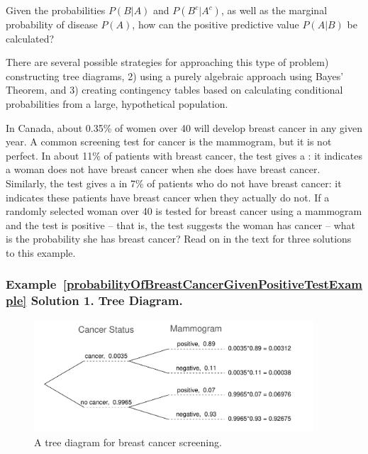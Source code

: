 Given the probabilities $P(B|A)$ and $P(B^c|A^c)$, as well as the marginal probability of disease $P(A)$, how can the positive predictive value $P(A|B)$ be calculated?

There are several possible strategies for approaching this type of problem) constructing tree diagrams, 2) using a purely algebraic approach using Bayes' Theorem, and 3) creating contingency tables based on calculating conditional probabilities from a large, hypothetical population.

\textD{\newpage}

\begin{examplewrap}
\begin{nexample}{In Canada, about 0.35\% of women over 40 will develop breast cancer in any given year. A common screening test for cancer is the mammogram, but it is not perfect. In about 11\% of patients with breast cancer, the test gives a : it indicates a woman does not have breast cancer when she does have breast cancer. Similarly, the test gives a  in 7\% of patients who do not have breast cancer: it indicates these patients have breast cancer when they actually do not.\footnotemark{}\label{probabilityOfBreastCancerGivenPositiveTestExample}%
If a randomly selected woman over 40 is tested for breast cancer using a mammogram and the test is positive -- that is, the test suggests the woman has cancer -- what is the probability she has breast cancer?}
Read on in the text for three solutions to this example.
\end{nexample}
\end{examplewrap}


\subsubsection{Example~\ref{probabilityOfBreastCancerGivenPositiveTestExample} Solution 1. Tree Diagram.}

\begin{figure}[h]
	\centering
	\includegraphics[width=0.93\textwidth]{ch_probability_oi_biostat/figures/BreastCancerTreeDiagram/BreastCancerTreeDiagram}
	\caption{A tree diagram for breast cancer screening.}
	\label{BreastCancerTreeDiagram}
\end{figure}

